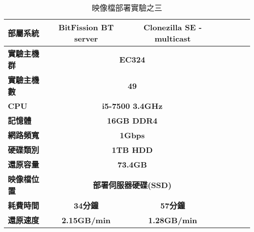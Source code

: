 \begin{table}[htbp]
\centering
\caption{映像檔部署實驗之三}
\label{exp3}
\begin{adjustbox}{max width=0.92\textwidth}
\begin{tabular}{lcccccc}

\toprule
\multicolumn{1}{l}{\textbf{部屬系統}} & \textbf{BitFission BT server} & \textbf{Clonezilla SE - multicast} \\ \midrule
\multicolumn{1}{l}{\textbf{實驗主機群}} & \multicolumn{2}{c}{\textbf{EC324}} \\
\multicolumn{1}{l}{\textbf{實驗主機數}} & \multicolumn{2}{c}{\textbf{49}} \\
\multicolumn{1}{l}{\textbf{CPU}} & \multicolumn{2}{c}{\textbf{i5-7500 3.4GHz}} \\
\multicolumn{1}{l}{\textbf{記憶體}} & \multicolumn{2}{c}{\textbf{16GB DDR4}} \\
\multicolumn{1}{l}{\textbf{網路頻寬}} & \multicolumn{2}{c}{\textbf{1Gbps}} \\
\multicolumn{1}{l}{\textbf{硬碟類別}} & \multicolumn{2}{c}{\textbf{1TB HDD}} \\
\multicolumn{1}{l}{\textbf{還原容量}} & \multicolumn{2}{c}{\textbf{73.4GB}} \\
\multicolumn{1}{l}{\textbf{映像檔位置}} & \multicolumn{2}{c}{\textbf{部署伺服器硬碟(SSD)}} \\
\multicolumn{1}{l}{\textbf{耗費時間}} & \textbf{34分鐘} & \textbf{57分鐘} \\
\multicolumn{1}{l}{\textbf{還原速度}} & \textbf{2.15GB/min} & \textbf{1.28GB/min} \\

\bottomrule
\end{tabular}
\end{adjustbox}
\end{table}
